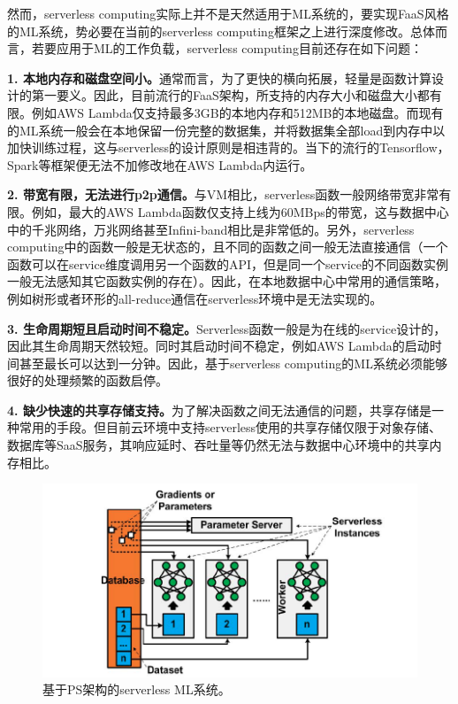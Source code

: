 然而，serverless computing实际上并不是天然适用于ML系统的，要实现FaaS风格的ML系统，势必要在当前的serverless computing框架之上进行深度修改。总体而言，若要应用于ML的工作负载，serverless computing目前还存在如下问题：

\textbf{1. 本地内存和磁盘空间小。}通常而言，为了更快的横向拓展，轻量是函数计算设计的第一要义。因此，目前流行的FaaS架构，所支持的内存大小和磁盘大小都有限。例如AWS Lambda仅支持最多3GB的本地内存和512MB的本地磁盘。而现有的ML系统一般会在本地保留一份完整的数据集，并将数据集全部load到内存中以加快训练过程，这与serverless的设计原则是相违背的。当下的流行的Tensorflow，Spark等框架便无法不加修改地在AWS Lambda内运行。

\textbf{2. 带宽有限，无法进行p2p通信。}与VM相比，serverless函数一般网络带宽非常有限。例如，最大的AWS Lambda函数仅支持上线为60MBps的带宽，这与数据中心中的千兆网络，万兆网络甚至Infini-band相比是非常低的。另外，serverless computing中的函数一般是无状态的，且不同的函数之间一般无法直接通信（一个函数可以在service维度调用另一个函数的API，但是同一个service的不同函数实例一般无法感知其它函数实例的存在）。因此，在本地数据中心中常用的通信策略，例如树形或者环形的all-reduce通信在serverless环境中是无法实现的。

\textbf{3. 生命周期短且启动时间不稳定。}Serverless函数一般是为在线的service设计的，因此其生命周期天然较短。同时其启动时间不稳定，例如AWS Lambda的启动时间甚至最长可以达到一分钟。因此，基于serverless computing的ML系统必须能够很好的处理频繁的函数启停。

\textbf{4. 缺少快速的共享存储支持。}为了解决函数之间无法通信的问题，共享存储是一种常用的手段。但目前云环境中支持serverless使用的共享存储仅限于对象存储、数据库等SaaS服务，其响应延时、吞吐量等仍然无法与数据中心环境中的共享内存相比。

\begin{figure}[h]
    \centerline{\includegraphics[width=\textwidth]{figures/data-para-faas-ml.png}}
    \caption{基于PS架构的serverless ML系统。}
    \label{data_para_faas_ml}
\end{figure}

